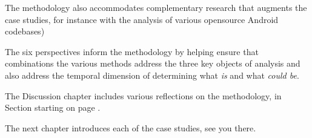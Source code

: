The methodology also accommodates complementary research that augments the case studies, for instance with the analysis of various opensource Android codebases)

The six perspectives inform the methodology by helping ensure that combinations the various methods address the three key objects of analysis and also address the temporal dimension of determining what \textit{is} and what \textit{could be}.

The Discussion chapter includes various reflections on the methodology, in Section  starting on page \pageref{discussion-on-methodology-and-case-study-procedure}.

The next chapter introduces each of the case studies, see you there.